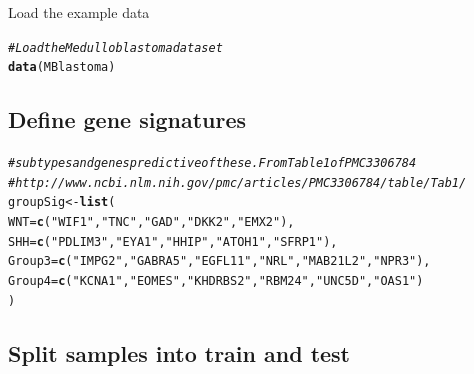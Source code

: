\documentclass{article}\usepackage[]{graphicx}\usepackage[]{color}
\makeatletter
\newcommand{\hlstr}[1]{\textcolor[rgb]{0.192,0.494,0.8}{#1}}%
\newcommand{\hlcom}[1]{\textcolor[rgb]{0.678,0.584,0.686}{\textit{#1}}}%
\newcommand{\hlstd}[1]{\textcolor[rgb]{0.345,0.345,0.345}{#1}}%
\newcommand{\hlkwb}[1]{\textcolor[rgb]{0.69,0.353,0.396}{#1}}%
\newcommand{\hlkwc}[1]{\textcolor[rgb]{0.333,0.667,0.333}{#1}}%
\newcommand{\hlkwd}[1]{\textcolor[rgb]{0.737,0.353,0.396}{\textbf{#1}}}%
\newenvironment{kframe}{%
 \def\at@end@of@kframe{}%
 \ifinner\ifhmode%
  \def\at@end@of@kframe{\end{minipage}}%
  \begin{minipage}{\columnwidth}%
 \fi\fi%
 \def\FrameCommand##1{\hskip\@totalleftmargin \hskip-\fboxsep
 \colorbox{shadecolor}{##1}\hskip-\fboxsep
     \hskip-\linewidth \hskip-\@totalleftmargin \hskip\columnwidth}%
 \MakeFramed {\advance\hsize-\width
   \@totalleftmargin\z@ \linewidth\hsize
   \@setminipage}}%
 {\par\unskip\endMakeFramed%
 \at@end@of@kframe}
\newenvironment{knitrout}{}{} %
\makeatother
\begin{document}
Load the example data
\begin{knitrout}
\color{fgcolor}\begin{kframe}
\begin{alltt}
\hlcom{# Load the Medulloblastoma dataset}
\hlkwd{data}\hlstd{(MBlastoma)}
\end{alltt}
\end{kframe}
\end{knitrout}

\subsection{Define gene signatures}

\begin{knitrout}
\color{fgcolor}\begin{kframe}
\begin{alltt}
\hlcom{# subtypes and genes predictive of these. From Table 1 of PMC3306784}
\hlcom{# http://www.ncbi.nlm.nih.gov/pmc/articles/PMC3306784/table/Tab1/}
\hlstd{groupSig} \hlkwb{<-} \hlkwd{list}\hlstd{(}
    \hlkwc{WNT}\hlstd{=}\hlkwd{c}\hlstd{(}\hlstr{"WIF1"}\hlstd{,}\hlstr{"TNC"}\hlstd{,}\hlstr{"GAD"}\hlstd{,}\hlstr{"DKK2"}\hlstd{,}\hlstr{"EMX2"}\hlstd{),}
    \hlkwc{SHH}\hlstd{=}\hlkwd{c}\hlstd{(}\hlstr{"PDLIM3"}\hlstd{,}\hlstr{"EYA1"}\hlstd{,}\hlstr{"HHIP"}\hlstd{,}\hlstr{"ATOH1"}\hlstd{,}\hlstr{"SFRP1"}\hlstd{),}
    \hlkwc{Group3}\hlstd{=}\hlkwd{c}\hlstd{(}\hlstr{"IMPG2"}\hlstd{,}\hlstr{"GABRA5"}\hlstd{,}\hlstr{"EGFL11"}\hlstd{,}\hlstr{"NRL"}\hlstd{,}\hlstr{"MAB21L2"}\hlstd{,}\hlstr{"NPR3"}\hlstd{),}
    \hlkwc{Group4}\hlstd{=}\hlkwd{c}\hlstd{(}\hlstr{"KCNA1"}\hlstd{,}\hlstr{"EOMES"}\hlstd{,}\hlstr{"KHDRBS2"}\hlstd{,}\hlstr{"RBM24"}\hlstd{,}\hlstr{"UNC5D"}\hlstd{,}\hlstr{"OAS1"}\hlstd{)}
\hlstd{)}
\end{alltt}
\end{kframe}
\end{knitrout}

\subsection{Split samples into train and test}
\end{document}
